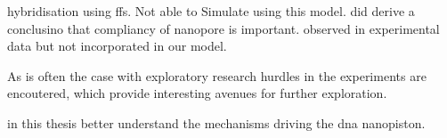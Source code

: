 hybridisation using ffs. Not able to Simulate using this model. did derive a conclusino
that compliancy of nanopore is important. observed in experimental data but not
incorporated in our model.

As is often the case with exploratory research hurdles in the experiments are encoutered,
which provide interesting avenues for further exploration.

in this thesis better understand the mechanisms driving the dna nanopiston.


%
%
%
%
%
%
%
%
%
%
%
%
%


